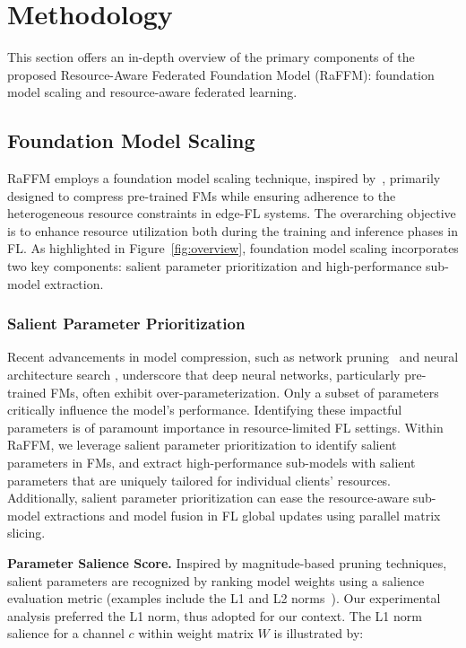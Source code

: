\section{Methodology}

This section offers an in-depth overview of the primary components of the proposed Resource-Aware Federated Foundation Model (RaFFM): foundation model scaling and resource-aware federated learning.

\subsection{Foundation Model Scaling}
RaFFM employs a foundation model scaling technique, inspired by~\citep{bootstrapnas_aaai}, primarily designed to compress pre-trained FMs while ensuring adherence to the heterogeneous resource constraints in edge-FL systems.  The overarching objective is to enhance resource utilization both during the training and inference phases in FL.
As highlighted in Figure~\ref{fig:overview}, foundation model scaling incorporates two key components: salient parameter prioritization and high-performance sub-model extraction.



\subsubsection{Salient Parameter Prioritization}
Recent advancements in model compression, such as network pruning~\citep{he2018amc,BlalockOFG20_pruning,yu2022gnnrl,yu2021agmc} and neural architecture search \citep{nas1000, munoz2022automated}, underscore that deep neural networks, particularly pre-trained FMs, often exhibit over-parameterization. Only a subset of parameters critically influence the model's performance.
Identifying these impactful parameters is of paramount importance in resource-limited FL settings. 
Within RaFFM, we leverage salient parameter prioritization to identify salient parameters in FMs, and extract high-performance sub-models with salient parameters that are uniquely tailored for individual clients' resources. Additionally, salient parameter prioritization can ease the resource-aware sub-model extractions and model fusion in FL global updates using parallel matrix slicing.



 \textbf{Parameter Salience Score.}
 Inspired by magnitude-based pruning techniques, salient parameters are recognized by ranking model weights using a salience evaluation metric (examples include the L1 and L2 norms~\citep{li2016l1pruning,kumar2021pruningl1}). Our experimental analysis preferred the L1 norm, thus adopted for our context. The L1 norm salience for a channel \(c\) within weight matrix \(W\) is illustrated by:


